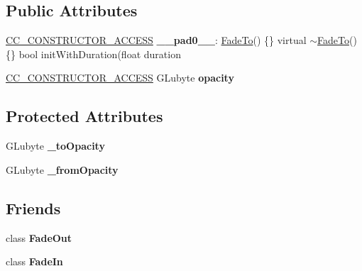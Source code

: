 \subsection*{Public Attributes}
\begin{DoxyCompactItemize}
\item 
\mbox{\label{classFadeTo_a91efc654de7d6761af3523891b7d4c1b}} 
\hyperlink{_2cocos2d_2cocos_2base_2ccConfig_8h_a25ef1314f97c35a2ed3d029b0ead6da0}{C\+C\+\_\+\+C\+O\+N\+S\+T\+R\+U\+C\+T\+O\+R\+\_\+\+A\+C\+C\+E\+SS} {\bfseries \+\_\+\+\_\+pad0\+\_\+\+\_\+}\+: \hyperlink{classFadeTo}{Fade\+To}() \{\} virtual $\sim$\hyperlink{classFadeTo}{Fade\+To}() \{\} bool init\+With\+Duration(float duration
\item 
\mbox{\label{classFadeTo_ad60f8e15f1a336f2e647e213ff0c28ff}} 
\hyperlink{_2cocos2d_2cocos_2base_2ccConfig_8h_a25ef1314f97c35a2ed3d029b0ead6da0}{C\+C\+\_\+\+C\+O\+N\+S\+T\+R\+U\+C\+T\+O\+R\+\_\+\+A\+C\+C\+E\+SS} G\+Lubyte {\bfseries opacity}
\end{DoxyCompactItemize}
\subsection*{Protected Attributes}
\begin{DoxyCompactItemize}
\item 
\mbox{\label{classFadeTo_af285ac310fbb747d6a0b9571806ce018}} 
G\+Lubyte {\bfseries \+\_\+to\+Opacity}
\item 
\mbox{\label{classFadeTo_acf31ba18446e88845e80e7c5a8462a4c}} 
G\+Lubyte {\bfseries \+\_\+from\+Opacity}
\end{DoxyCompactItemize}
\subsection*{Friends}
\begin{DoxyCompactItemize}
\item 
\mbox{\label{classFadeTo_aa2cfd51ccffec8799710c402d684bb17}} 
class {\bfseries Fade\+Out}
\item 
\mbox{\label{classFadeTo_a14d4063a0851c4a5a57f6a1be2ea9ee2}} 
class {\bfseries Fade\+In}
\end{DoxyCompactItemize}
